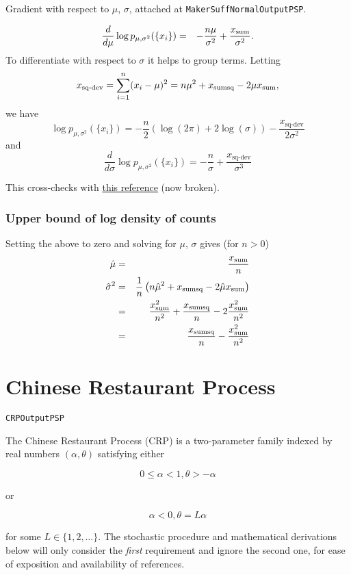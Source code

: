 \documentclass[12pt]{article}
\begin{document}
Gradient with respect to $\mu$, $\sigma$, attached at \texttt{MakerSuffNormalOutputPSP}.

\begin{eqnarray*}
\frac{d}{d\mu} \log p_{\mu,\sigma^2}(\{x_i\}) & = & -\frac{n\mu}{\sigma^2} + 
    \frac{x_{\textrm{sum}}}{\sigma^2}.
\end{eqnarray*}
To differentiate with respect to $\sigma$ it helps to group terms.  Letting
\newcommand{\deviance}{x_{\textrm{sq-dev}}}
\[ \deviance = \sum_{i=1}^n (x_i - \mu)^2 = n\mu^2 + \xsumsq - 2 \mu \xsum, \]
we have
\[ \log p_{\mu,\sigma^2}(\{x_i\}) = -\frac{n}{2}(\log(2\pi) + 2\log(\sigma))
   - \frac{\deviance}{2\sigma^2} \]
and
\[ \frac{d}{d\sigma} \log p_{\mu,\sigma^2}(\{x_i\}) = -\frac{n}{\sigma} + 
    \frac{\deviance}{\sigma^3} \]

This cross-checks with
\href{http://aleph0.clarku.edu/~djoyce/ma218/meeting12.pdf}{this reference} (now broken).

\subsubsection{Upper bound of log density of counts}

Setting the above to zero and solving for $\mu$, $\sigma$ gives (for $n > 0$)
\begin{eqnarray*}
 \hat\mu & = & \frac{x_{\textrm{sum}}}{n} \\
 \hat\sigma^2 & = & \frac{1}{n}\left(n\hat\mu^2 + x_{\textrm{sumsq}} -2\hat\mu x_{\textrm{sum}}\right) \\
  & = & \frac{x_{\textrm{sum}}^2}{n^2} + \frac{x_{\textrm{sumsq}}}{n} - 2\frac{x_{\textrm{sum}}^2}{n^2} \\
  & = & \frac{x_{\textrm{sumsq}}}{n} - \frac{x_{\textrm{sum}}^2}{n^2}
\end{eqnarray*}

\section{Chinese Restaurant Process}

\texttt{CRPOutputPSP}

The Chinese Restaurant Process (CRP) is a two-parameter family indexed by
real numbers $(\alpha, \theta)$ satisfying either

\[
0 \le \alpha < 1, \theta > - \alpha
\]

or

\[
\alpha < 0, \theta = L\alpha
\]

for some $L \in \{1,2,\dots\}$. The stochastic procedure and mathematical
derivations below will only consider the \textit{first} requirement and
ignore the second one, for ease of exposition and availability of references.
\end{document}
